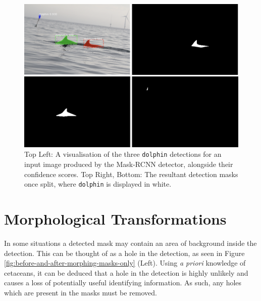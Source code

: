 \begin{figure}[h]
	\begin{center}
		\includegraphics[scale=0.5]{Chapter4/figs/190730-001-MOLS0360_-detections.png}
	\end{center}
	\caption{Top Left: A visualisation of the three \texttt{dolphin} detections for an input image produced by the Mask-RCNN detector, alongside their confidence scores. Top Right, Bottom: The resultant detection masks once split, where \texttt{dolphin} is displayed in white.}
	\label{fig:190730-001-MOLS0360_-detections}
\end{figure}


\section{Morphological Transformations}\label{ch:postProcessing,sec:morphologicalTransformations}

In some situations a detected mask may contain an area of background inside the detection. This can be thought of as a hole in the detection, as seen in Figure \ref{fig:before-and-after-morphing-masks-only} (Left). Using \textit{a priori} knowledge of cetaceans, it can be deduced that a hole in the detection is highly unlikely and causes a loss of potentially useful identifying information. As such, any holes which are present in the masks must be removed. 

